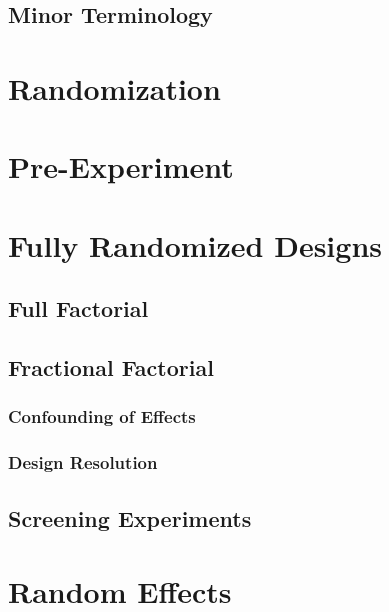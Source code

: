 \subsection{Minor Terminology}


\section{Randomization}



\section{Pre-Experiment}





\section{Fully Randomized Designs}

\subsection{Full Factorial}

\subsection{Fractional Factorial}

\subsubsection{Confounding of Effects}

\subsubsection{Design Resolution}


\subsection{Screening Experiments}

\section{Random Effects}

